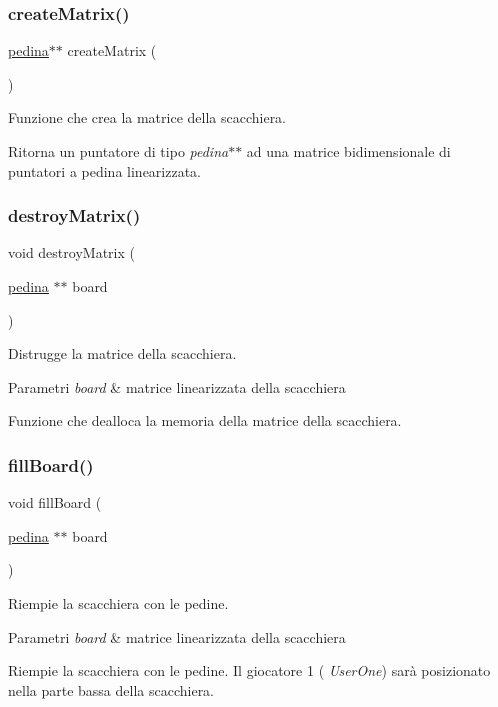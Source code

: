 \subsubsection{\texorpdfstring{create\+Matrix()}{createMatrix()}}
{\footnotesize\ttfamily \hyperlink{ml__lib_8h_a71fee95122b31f5cb0b07d9c16ffa3a5}{pedina}$\ast$$\ast$ create\+Matrix (\begin{DoxyParamCaption}{ }\end{DoxyParamCaption})}



Funzione che crea la matrice della scacchiera. 

Ritorna un puntatore di tipo {\itshape pedina$\ast$$\ast$} ad una matrice bidimensionale di puntatori a pedina linearizzata. \mbox{\label{group__Memoria_ga898a4ffd57725b4666aa768ca71f1e1f}} 
\subsubsection{\texorpdfstring{destroy\+Matrix()}{destroyMatrix()}}
{\footnotesize\ttfamily void destroy\+Matrix (\begin{DoxyParamCaption}\item[{\hyperlink{ml__lib_8h_a71fee95122b31f5cb0b07d9c16ffa3a5}{pedina} $\ast$$\ast$}]{board }\end{DoxyParamCaption})}



Distrugge la matrice della scacchiera. 


\begin{DoxyParams}{Parametri}
{\em board} & matrice linearizzata della scacchiera\\
\hline
\end{DoxyParams}
Funzione che dealloca la memoria della matrice della scacchiera. \mbox{\label{group__Memoria_ga421a28d47106a4070c6eea92c1401821}} 
\subsubsection{\texorpdfstring{fill\+Board()}{fillBoard()}}
{\footnotesize\ttfamily void fill\+Board (\begin{DoxyParamCaption}\item[{\hyperlink{ml__lib_8h_a71fee95122b31f5cb0b07d9c16ffa3a5}{pedina} $\ast$$\ast$}]{board }\end{DoxyParamCaption})}



Riempie la scacchiera con le pedine. 


\begin{DoxyParams}{Parametri}
{\em board} & matrice linearizzata della scacchiera\\
\hline
\end{DoxyParams}
Riempie la scacchiera con le pedine. Il giocatore 1 ( {\itshape User\+One}) sarà posizionato nella parte bassa della scacchiera. 